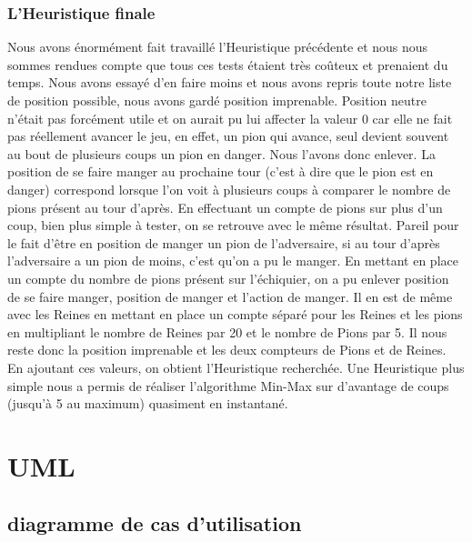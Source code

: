 \documentclass[12,french]{report}
\begin{document}
\subsection{L'Heuristique finale}
Nous avons énormément fait travaillé l'Heuristique précédente et nous nous sommes rendues compte que tous ces tests étaient très coûteux et prenaient du temps.
Nous avons essayé d'en faire moins et nous avons repris toute notre liste de position possible, nous avons gardé position imprenable. Position neutre n'était pas forcément utile et on aurait pu lui affecter la valeur 0 car elle ne fait pas réellement avancer le jeu, en effet, un pion qui avance, seul devient souvent au bout de plusieurs coups un pion en danger. Nous l'avons donc enlever. 
La position de se faire manger au prochaine tour (c'est à dire que le pion est en danger) correspond lorsque l'on voit à plusieurs coups à comparer le nombre de pions présent au tour d'après. En effectuant un compte de pions sur plus d'un coup, bien plus simple à tester, on se retrouve avec le même résultat. Pareil pour le fait d'être en position de manger un pion de l'adversaire, si au tour d'après l'adversaire a un pion de moins, c'est qu'on a pu le manger.
En mettant en place un compte du nombre de pions présent sur l'échiquier, on a pu enlever position de se faire manger, position de manger et l'action de manger. Il en est de même avec les Reines en mettant en place un compte séparé pour les Reines et les pions en multipliant le nombre de Reines par 20 et le nombre de Pions par 5. 
Il nous reste donc la position imprenable et les deux compteurs de Pions et de Reines. En ajoutant ces valeurs, on obtient l'Heuristique recherchée. Une Heuristique plus simple nous a permis de réaliser l'algorithme Min-Max sur d'avantage de coups (jusqu'à 5 au maximum) quasiment en instantané.



\chapter{UML}

\section{diagramme de cas d'utilisation}
\end{document}
